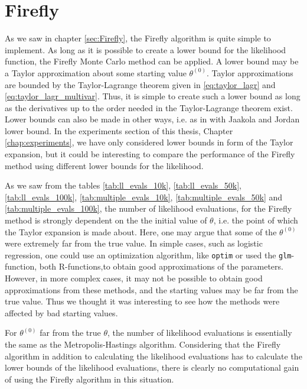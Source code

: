\section{Firefly}
As we saw in chapter \ref{sec:Firefly}, the Firefly algorithm is quite simple to implement. As long as it is possible to create a lower bound for the likelihood function, the Firefly Monte Carlo method can be applied. A lower bound may be a Taylor approximation about some starting value $\theta^{\left(0\right)}$.  Taylor approximations are bounded by the Taylor-Lagrange theorem given in  \eqref{eq:taylor_lagr} and \eqref{eq:taylor_lagr_multivar}. Thus, it is simple to create such a lower bound as long as the derivatives up to the order needed in the Taylor-Lagrange theorem exist. Lower bounds can also be made in other ways, i.e. as in  \cite{Maclaurin:1} with Jaakola and Jordan lower bound. In the experiments section of this thesis, Chapter \ref{chap:experiments}, we have only considered lower bounds in form of the Taylor expansion, but it could be interesting to compare the performance of the Firefly method using different lower bounds for the likelihood.

As we saw from the tables \ref{tab:ll_evals_10k}, \ref{tab:ll_evals_50k}, \ref{tab:ll_evals_100k}, \ref{tab:multiple_evals_10k}, \ref{tab:multiple_evals_50k} and \ref{tab:multiple_evals_100k},  the number of  likelihood evaluations, for the Firefly method is strongly dependent on the the initial value of $\theta$, i.e. the point of which the Taylor expansion is made about.
Here, one may argue that some of the $\theta^{\left(0\right)}$ were extremely far from the true value. In simple cases, such as logistic regression, one could use an optimization algorithm, like \texttt{optim} or used the \texttt{glm}-function, both R-functions,to obtain good approximations of the parameters. 
However, in more complex cases, it may not be possible to obtain good approximations from these methods, and the starting values may be far from the true value. 
Thus we thought it was interesting to see how the methods were affected by bad starting values. 

 
For $\theta^{\left(0\right)}$ far from the true $\theta$, the number of likelihood evaluations is essentially the same as the Metropolis-Hastings algorithm.
Considering that the Firefly algorithm in addition to calculating the likelihood evaluations has to calculate the lower bounds of the likelihood evaluations, there is clearly no computational gain of using the Firefly algorithm in this situation.

